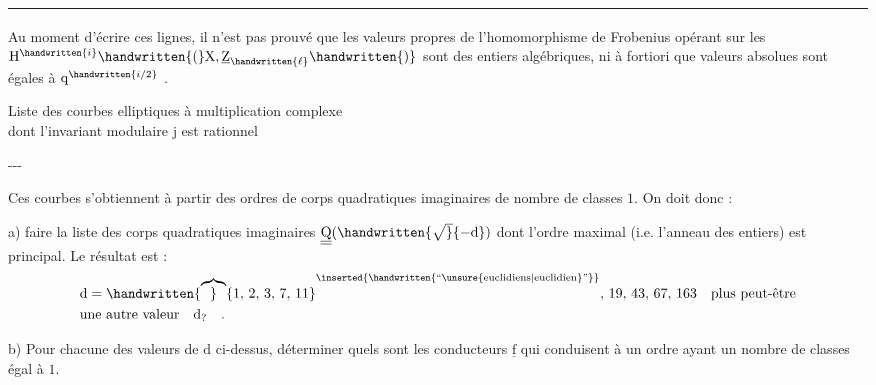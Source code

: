 \begin{minipage}{\linewidth}
\smallskip
\noindent\rule{0.32\linewidth}{0.4pt}\par
{\footnotesize\noindent\textsuperscript{}\quad Au moment d'écrire ces lignes, il n'est pas prouvé que les valeurs propres de l'homomorphisme de Frobenius opérant sur les $\mathrm{H}^{\handwritten{i}}\handwritten{(}\mathrm{X},\underline{\mathrm{Z}}_{\handwritten{\ell}}\handwritten{)}$ sont des entiers algébriques, ni à fortiori que \begingroup\let\sout\mbox{}\endgroup{} valeurs absolues sont égales à $\mathrm{q}^{\handwritten{i/2}}$ .\par}
\end{minipage}
\clearpage
{}
\reversemarginpar
{}
\normalmarginpar
{}

\begin{center}
Liste des courbes elliptiques à multiplication complexe\\
dont l'invariant modulaire $\mathrm{j}$ est rationnel

\medskip
-{}-{}-
\end{center}

Ces courbes s'obtiennent à partir des ordres de corps quadratiques imaginaires de nombre de classes $1$. On doit donc :

a) faire la liste des corps quadratiques imaginaires $\underline{\underline{\mathrm{Q}}}(\handwritten{\sqrt}{-\mathrm{d}})$ dont l'ordre maximal (i.e. l'anneau des entiers) est principal. Le résultat est :
\reversemarginpar
{}
\normalmarginpar
\[
\begin{aligned}
&\mathrm{d} = \handwritten{\overbrace}{1,\,2,\,3,\,7,\,11}^{\inserted{\handwritten{\text{``\unsure{euclidiens|euclidien}''}}}},\,19,\,43,\,67,\,163 \quad \text{plus peut-être}\\
&\text{une autre valeur}\quad \mathrm{d}_{?}\quad .
\end{aligned}
\]

b) Pour chacune des valeurs de $\mathrm{d}$ ci-dessus, déterminer quels sont les conducteurs $\underline{\mathrm{f}}$ qui conduisent à un ordre ayant un nombre de classes égal à $1$.

